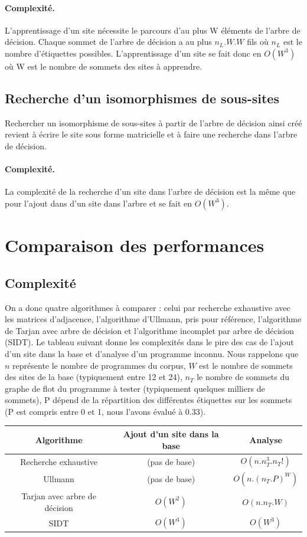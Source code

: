 \paragraph{Complexité.}
L'apprentissage d'un site nécessite le parcours d'au plus W éléments de l'arbre de décision. Chaque sommet de l'arbre de décision a au plus $n_L.W.W$ fils où $n_L$ est le nombre d'étiquettes possibles. L'apprentissage d'un site se fait donc en $O(W^3)$ où W est le nombre de sommets des sites à apprendre.

\subsection{Recherche d'un isomorphismes de sous-sites}
Rechercher un isomorphisme de sous-sites à partir de l'arbre de décision ainsi créé revient à écrire le site sous forme matricielle et à faire une recherche dans l'arbre de décision.

\paragraph{Complexité.}
La complexité de la recherche d'un site dans l'arbre de décision est la même que pour l'ajout dans d'un site dans l'arbre et se fait en $O(W^3)$. 


\section{Comparaison des performances}
\subsection{Complexité}
On a donc quatre algorithmes à comparer : celui par recherche exhaustive avec les matrices d'adjacence, l'algorithme d'Ullmann, pris pour référence, l'algorithme de Tarjan avec arbre de décision et l'algorithme incomplet par arbre de décision (SIDT).
Le tableau suivant donne les complexités dans le pire des cas de l'ajout d'un site dans la base et d'analyse d'un programme inconnu.
Nous rappelons que $n$ représente le nombre de programmes du corpus, $W$ est le nombre de sommets des sites de la base (typiquement entre 12 et 24), $n_T$ le nombre de sommets du graphe de flot du programme à tester (typiquement quelques milliers de sommets), P dépend de la répartition des différentes étiquettes sur les sommets (P est compris entre 0 et 1, nous l'avons évalué à 0.33).

\begin{center}
\begin{tabular}{|c|c|c|}
 \hline
 Algorithme & Ajout d'un site dans la base & Analyse\\
 \hline
 Recherche exhaustive & (pas de base) & $O(n.n_T^3.n_T!)$\\
 Ullmann & (pas de base) & $O(n.(n_T.P)^W)$ \\
 Tarjan avec arbre de décision & $O(W^2)$ & $O(n.n_T.W)$\\
 SIDT & $O(W^3)$ & $O(W^3)$\\
 \hline
\end{tabular} 
\end{center}

